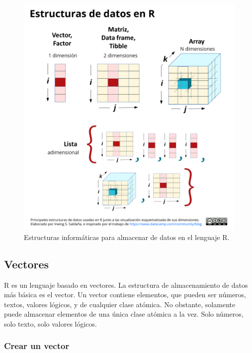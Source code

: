 \documentclass[
]{article}
\theoremstyle{definition}
\theoremstyle{definition}
\theoremstyle{definition}
\theoremstyle{definition}
\theoremstyle{remark}
\begin{document}
\begin{figure}

{\centering \includegraphics[width=1\linewidth]{figs/elaboradas/Estructuras de datos en R} 

}

\caption{Estructuras informáticas para almacenar de datos en el lenguaje R.}\label{fig:figura44}
\end{figure}

\hypertarget{vectores}{%
\subsection{Vectores}\label{vectores}}

R es un lenguaje basado en vectores. La estructura de almacenamiento de datos más básica es el vector. Un vector contiene elementos, que pueden ser números, textos, valores lógicos, y de cualquier clase atómica. No obstante, solamente puede almacenar elementos de una única clase atómica a la vez. Solo números, solo texto, solo valores lógicos.

\hypertarget{crear-un-vector}{%
\subsubsection{Crear un vector}\label{crear-un-vector}}
\end{document}
